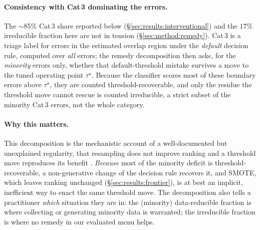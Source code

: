 \paragraph{Consistency with Cat\,3 dominating the errors.} The $\sim$85\% Cat\,3
share reported below (\S\ref{sec:results:interventional}) and the $17\%$ irreducible
fraction here are not in tension (\S\ref{sec:method:remedy}). Cat\,3 is a triage
label for errors in the estimated overlap region under the \emph{default} decision
rule, computed over \emph{all} errors; the remedy decomposition then asks, for the
\emph{minority} errors only, whether that default-threshold mistake survives a move
to the tuned operating point $\tau^\star$. Because the classifier scores most of
these boundary errors above $\tau^\star$, they are counted threshold-recoverable,
and only the residue the threshold move cannot rescue is counted irreducible, a
strict subset of the minority Cat\,3 errors, not the whole category.

\begin{table}[t]
\centering
\caption{Remedy decomposition of the misclassified minority (mean over the 67
datasets of the 79-dataset roster with $\ge5$ minority default errors). Default
errors are the ensemble's out-of-bag argmax mistakes; recovery is judged under a
cross-fitted threshold (\S\ref{sec:method:remedy}); the instrument is the
unweighted ensemble (class-weighted sensitivity in the text). Columns: fraction
of minority errors that are threshold-recoverable (the decision-rule move
corrects them), data-reducible (epistemic; more minority data helps),
irreducible (aleatoric; model-estimated overlap), or noise. The deficit is
predominantly a thresholding artefact, increasingly so with imbalance.}
\label{tab:reducibility}

\end{table}

\paragraph{Why this matters.} This decomposition is the mechanistic account of a
well-documented but unexplained regularity, that resampling does not improve
ranking and a threshold move reproduces its benefit
\cite{provost2000imbalanced,elkan2001foundations,elor2022smote,goorbergh2022harm}.
\emph{Because} most of the minority deficit is threshold-recoverable, a
non-generative change of the decision rule recovers it, and SMOTE, which
leaves ranking unchanged (\S\ref{sec:results:frontier}), is at best an implicit,
inefficient way to enact the same threshold move. The decomposition also tells a
practitioner \emph{which} situation they are in: the (minority) data-reducible
fraction is where collecting or generating minority data is warranted; the
irreducible fraction is where no remedy in our evaluated menu helps.

